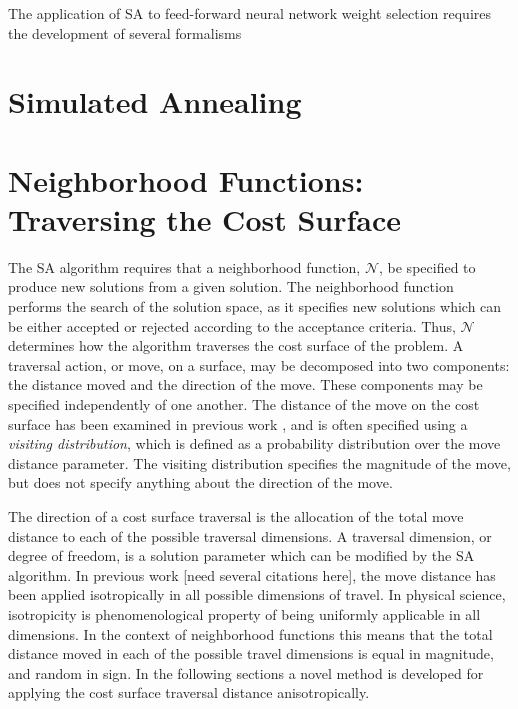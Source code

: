 \documentclass[11pt]{afthesis}
\begin{document}
	The application of SA to feed-forward neural network weight selection requires the development of several formalisms 
	
	\section{Simulated Annealing}
	
	\section{Neighborhood Functions: Traversing the Cost Surface}
	
	The SA algorithm requires that a neighborhood function, \begin{math} \mathcal{N} \end{math}, be specified to produce new solutions from a given solution. The neighborhood function performs the search of the solution space, as it specifies new solutions which can be either accepted or rejected according to the acceptance criteria. Thus, \begin{math} \mathcal{N} \end{math} determines how the algorithm traverses the cost surface of the problem. A traversal action, or move, on a surface, may be decomposed into two components: the distance moved and the direction of the move. These components may be specified independently of one another. The distance of the move on the cost surface has been examined in previous work \cite{szu1987fastsimulatedannealing,tsallis1996generalizedsimulatedannealing}, and is often specified using a \textit{visiting distribution}, which is defined as a probability distribution over the move distance parameter. The visiting distribution specifies the magnitude of the move, but does not specify anything about the direction of the move. 
	
	The direction of a cost surface traversal is the allocation of the total move distance to each of the possible traversal dimensions. A traversal dimension, or degree of freedom, is a solution parameter which can be modified by the SA algorithm. In previous work [need several citations here]\cite{}, the move distance has been applied isotropically in all possible dimensions of travel. In physical science, isotropicity is phenomenological property of being uniformly applicable in all dimensions. In the context of neighborhood functions this means that the total distance moved in each of the possible travel dimensions is equal in magnitude, and random in sign. In the following sections a novel method is developed for applying the cost surface traversal distance anisotropically. 
	
\end{document}
